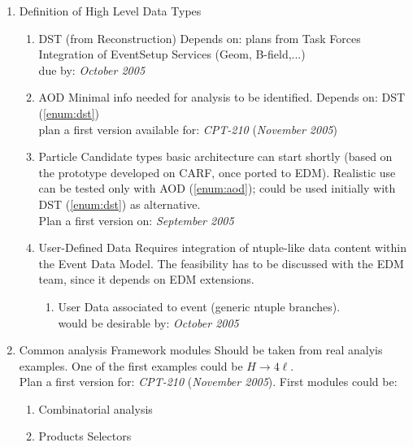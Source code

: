 \documentclass[draftmode]{memarticle}
\begin{document}
\begin{enumerate}
  \item Definition of High Level Data Types
  \begin{enumerate}
    \item DST (from Reconstruction) \label{enum:dst}
           Depends on:
             plans from Task Forces
             Integration of EventSetup Services (Geom, B-field,...)\\
             due by: {\em October 2005}
    \item AOD \label{enum:aod}
           Minimal info needed for analysis to be identified.
           Depends on:
             DST (\ref{enum:dst}) \\
           plan a first version available for: {\em CPT-210} ({\em November 2005})
    \item Particle Candidate types \label{enum:candidates}
           basic architecture can start shortly (based on the
           prototype developed on CARF, once ported to EDM).
           Realistic use can be tested only with
             AOD (\ref{enum:aod}); could be used initially
           with DST (\ref{enum:dst}) as alternative.\\
           Plan a first version on: {\em September 2005}
    \item User-Defined Data 
           Requires integration of ntuple-like data content within
           the Event Data Model. 
           The feasibility has to be discussed with the EDM team, 
           since it depends on EDM extensions.
    \begin{enumerate}
      \item User Data associated to event (generic ntuple branches)\label{enum:userdataev}. \\
           would be desirable by: {\em October 2005}            
     \end{enumerate}
  \end{enumerate}
  \item Common analysis Framework modules \label{enum:commonmodules}
       Should be taken from real analyis examples. One of the first
       examples could be $H\rightarrow 4 \ell$. \\
       Plan a first version for: {\em CPT-210} ({\em November 2005}).
       First modules could be:
  \begin{enumerate}
    \item Combinatorial analysis
    \item Products Selectors
  \end{enumerate}

\end{enumerate}
\end{document}
